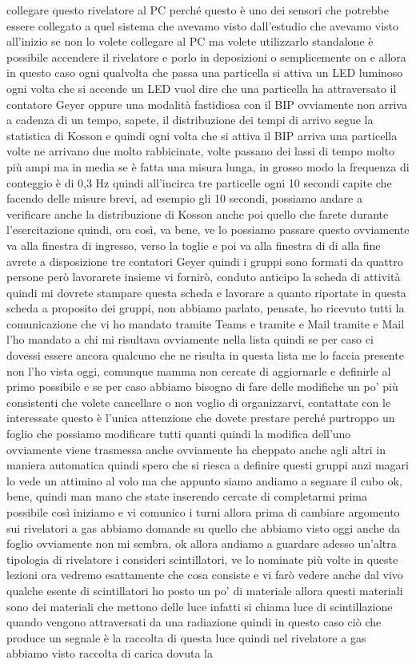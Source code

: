 collegare questo rivelatore al PC perché questo è uno dei sensori che potrebbe essere collegato a quel sistema che avevamo visto dall'estudio che avevamo visto all'inizio se non lo volete collegare al PC ma volete utilizzarlo standalone è possibile accendere il rivelatore e porlo in deposizioni o semplicemente on e allora in questo caso ogni qualvolta che passa una particella si attiva un LED luminoso ogni volta che si accende un LED vuol dire che una particella ha attraversato il contatore Geyer oppure una modalità fastidiosa con il BIP ovviamente non arriva a cadenza di un tempo, sapete, il distribuzione dei tempi di arrivo segue la statistica di Kosson e quindi ogni volta che si attiva il BIP arriva una particella volte ne arrivano due molto rabbicinate, volte passano dei lassi di tempo molto più ampi ma in media se è fatta una misura lunga, in grosso modo la frequenza di conteggio è di 0,3 Hz quindi all'incirca tre particelle ogni 10 secondi capite che facendo delle misure brevi, ad esempio gli 10 secondi, possiamo andare a verificare anche la distribuzione di Kosson anche poi quello che farete durante l'esercitazione quindi, ora così, va bene, ve lo possiamo passare questo ovviamente va alla finestra di ingresso, verso la toglie e poi va alla finestra di di alla fine avrete a disposizione tre contatori Geyer quindi i gruppi sono formati da quattro persone però lavorarete insieme vi fornirò, conduto anticipo la scheda di attività quindi mi dovrete stampare questa scheda e lavorare a quanto riportate in questa scheda a proposito dei gruppi, non abbiamo parlato, pensate, ho ricevuto tutti la comunicazione che vi ho mandato tramite Teams e tramite e Mail tramite e Mail l'ho mandato a chi mi risultava ovviamente nella lista quindi se per caso ci dovessi essere ancora qualcuno che ne risulta in questa lista me lo faccia presente non l'ho vista oggi, comunque mamma non cercate di aggiornarle e definirle al primo possibile e se per caso abbiamo bisogno di fare delle modifiche un po' più consistenti che volete cancellare o non voglio di organizzarvi, contattate con le interessate questo è l'unica attenzione che dovete prestare perché purtroppo un foglio che possiamo modificare tutti quanti quindi la modifica dell'uno ovviamente viene trasmessa anche ovviamente ha cheppato anche agli altri in maniera automatica quindi spero che si riesca a definire questi gruppi anzi magari lo vede un attimino al volo ma che appunto siamo andiamo a segnare il cubo ok, bene, quindi man mano che state inserendo cercate di completarmi prima possibile così iniziamo e vi comunico i turni allora prima di cambiare argomento sui rivelatori a gas abbiamo domande su quello che abbiamo visto oggi anche da foglio ovviamente non mi sembra, ok allora andiamo a guardare adesso un'altra tipologia di rivelatore i consideri scintillatori, ve lo nominate più volte in queste lezioni ora vedremo esattamente che cosa consiste e vi farò vedere anche dal vivo qualche esente di scintillatori ho posto un po' di materiale allora questi materiali sono dei materiali che mettono delle luce infatti si chiama luce di scintillazione quando vengono attraversati da una radiazione quindi in questo caso ciò che produce un segnale è la raccolta di questa luce quindi nel rivelatore a gas abbiamo visto raccolta di carica dovuta la 